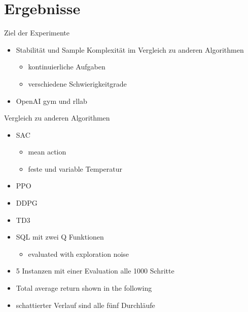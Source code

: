 \section{Ergebnisse}




\begin{frame}{Ziel der Experimente}
        \begin{itemize}
            \item Stabilität und Sample Komplexität im Vergleich zu anderen Algorithmen
            \begin{itemize}
                \item kontinuierliche Aufgaben
                \item verschiedene Schwierigkeitgrade
            \end{itemize}  
            \item OpenAI gym und rllab
        \end{itemize}
\end{frame}

\begin{frame}{Vergleich zu anderen Algorithmen}
    \begin{itemize}
        \item SAC
        \begin{itemize}
            \item mean action
            \item feste und variable Temperatur
        \end{itemize} 
        \item PPO
        \item DDPG
        \item TD3
        \item SQL mit zwei Q Funktionen
        \begin{itemize}
            \item evaluated with exploration noise
        
        \end{itemize}
        \item 5 Instanzen mit einer Evaluation alle 1000 Schritte
        \item Total average return shown in the following
        \item schattierter Verlauf sind alle fünf Durchläufe
        
    \end{itemize}
        
\end{frame}

